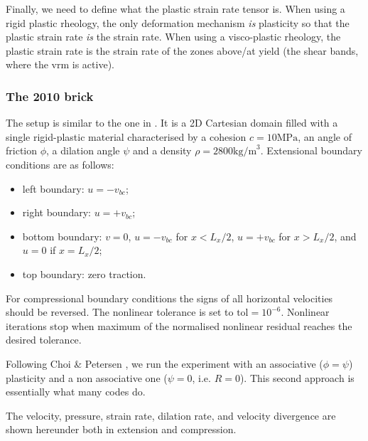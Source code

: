 Finally, we need to define what the plastic strain rate tensor is. When using a rigid plastic 
rheology, the only deformation mechanism {\it is} plasticity so that the plastic strain rate {\it is}
the strain rate. When using a visco-plastic rheology, the plastic strain rate is the strain rate 
of the zones above/at yield (the shear bands, where the vrm is active).
 
\subsubsection*{The 2010 brick}

The setup is similar to the one in \cite{kaus10}. It is a 2D Cartesian domain filled with a 
single rigid-plastic material characterised by a cohesion $c=10\text{MPa}$, an 
angle of friction $\phi$, a dilation angle $\psi$ and a density $\rho=2800\text{kg/m}^3$.
Extensional boundary conditions are as follows: 
\begin{itemize}
\item left boundary: $u=- v_{bc}$;
\item right boundary: $u=+ v_{bc}$; 
\item bottom boundary: $v=0$, $u=- v_{bc}$ for $x<L_x/2$,  $u=+ v_{bc}$ for $x>L_x/2$, and $u=0$ if $x=L_x/2$;
\item top boundary: zero traction.
\end{itemize}
For compressional boundary conditions the signs of all horizontal velocities should be reversed.
The nonlinear tolerance is set to $\text{tol}=10^{-6}$. Nonlinear iterations stop when 
maximum of the normalised nonlinear residual reaches the desired tolerance.

Following Choi \& Petersen \cite{chpe15}, we run the experiment with an associative ($\phi=\psi$) plasticity
and a non associative one ($\psi=0$, i.e. $R=0$). This second approach is essentially what many codes 
do. 

The velocity, pressure, strain rate, dilation rate, and velocity divergence are shown hereunder both in 
extension and compression.

